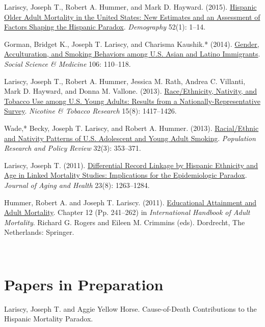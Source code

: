 \documentclass[11pt,]{article}
\begin{document}
Lariscy, Joseph T., Robert A. Hummer, and Mark D. Hayward. (2015).
\href{https://read.dukeupress.edu/demography/article/52/1/1/169365/Hispanic-Older-Adult-Mortality-in-the-United}{Hispanic
Older Adult Mortality in the United States: New Estimates and an
Assessment of Factors Shaping the Hispanic Paradox}. \emph{Demography}
52(1): 1--14.

Gorman, Bridget K., Joseph T. Lariscy, and Charisma Kaushik.* (2014).
\href{https://www.sciencedirect.com/science/article/pii/S0277953614000999?via\%3Dihub}{Gender,
Acculturation, and Smoking Behaviors among U.S. Asian and Latino
Immigrants}. \emph{Social Science \& Medicine} 106: 110--118.

Lariscy, Joseph T., Robert A. Hummer, Jessica M. Rath, Andrea C.
Villanti, Mark D. Hayward, and Donna M. Vallone. (2013).
\href{https://academic.oup.com/ntr/article/15/8/1417/1283744}{Race/Ethnicity,
Nativity, and Tobacco Use among U.S. Young Adults: Results from a
Nationally-Representative Survey}. \emph{Nicotine \& Tobacco Research}
15(8): 1417--1426.

Wade,* Becky, Joseph T. Lariscy, and Robert A. Hummer. (2013).
\href{https://link.springer.com/article/10.1007/s11113-013-9275-8}{Racial/Ethnic
and Nativity Patterns of U.S. Adolescent and Young Adult Smoking}.
\emph{Population Research and Policy Review} 32(3): 353--371.

Lariscy, Joseph T. (2011).
\href{https://journals.sagepub.com/doi/full/10.1177/0898264311421369}{Differential
Record Linkage by Hispanic Ethnicity and Age in Linked Mortality
Studies: Implications for the Epidemiologic Paradox}. \emph{Journal of
Aging and Health} 23(8): 1263--1284.

Hummer, Robert A. and Joseph T. Lariscy. (2011).
\href{https://www.researchgate.net/publication/216839888_Educational_Attainment_and_Adult_Mortality}{Educational
Attainment and Adult Mortality}. Chapter 12 (Pp. 241--262) in
\emph{International Handbook of Adult Mortality}. Richard G. Rogers and
Eileen M. Crimmins (eds). Dordrecht, The Netherlands: Springer.

~

\section{Papers in Preparation}\label{papers-in-preparation}

Lariscy, Joseph T. and Aggie Yellow Horse. Cause-of-Death Contributions
to the Hispanic Mortality Paradox.
\end{document}
